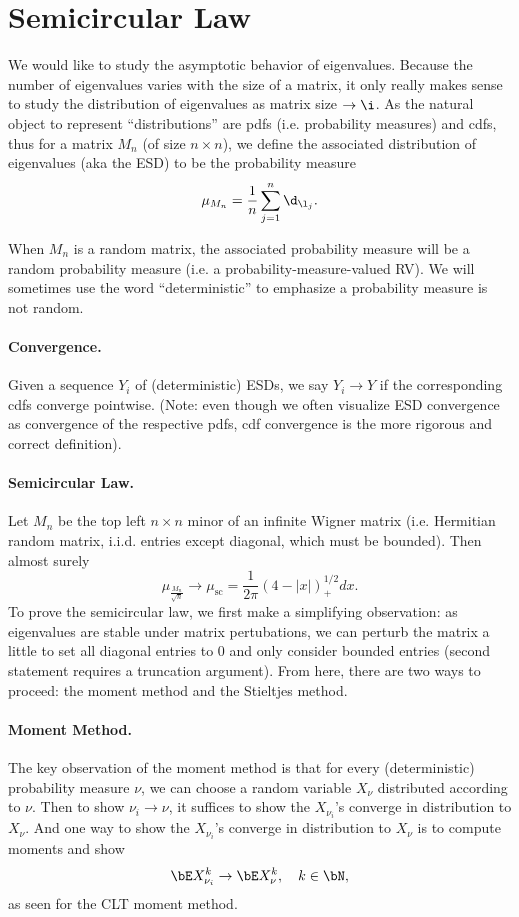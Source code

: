 \section{Semicircular Law}

We would like to study the asymptotic behavior of eigenvalues. Because the number of eigenvalues varies with the size of a matrix, it only really makes sense to study the distribution of eigenvalues as matrix size $\to \i$. As the natural object to represent ``distributions'' are pdfs (i.e. probability measures) and cdfs, thus for a matrix $M_n$ (of size $n \times n$), we define the associated distribution of eigenvalues (aka the ESD) to be the probability measure
\[
    \mu_{M_n} = \frac{1}{n} \sum_{j = 1}^n \d_{\l_j}.
\]

When $M_n$ is a random matrix, the associated probability measure will be a random probability measure (i.e. a probability-measure-valued RV). We will sometimes use the word ``deterministic'' to emphasize a probability measure is not random.

\paragraph{Convergence.} Given a sequence $Y_i$ of (deterministic) ESDs, we say $Y_i \to Y$ if the corresponding cdfs converge pointwise. (Note: even though we often visualize ESD convergence as convergence of the respective pdfs, cdf convergence is the more rigorous and correct definition).

\paragraph{Semicircular Law.} Let $M_n$ be the top left $n \times n$ minor of an infinite Wigner matrix (i.e. Hermitian random matrix, i.i.d. entries except diagonal, which must be bounded). Then almost surely
\[
    \mu_{\frac{M_n}{\sqrt{n}}} \to \mu_{\text{sc}} = \frac{1}{2\pi}(4 - |x|)_+^{1/2}dx.
\]
To prove the semicircular law, we first make a simplifying observation: as eigenvalues are stable under matrix pertubations, we can perturb the matrix a little to set all diagonal entries to 0 and only consider bounded entries (second statement requires a truncation argument). From here, there are two ways to proceed: the moment method and the Stieltjes method.

\paragraph{Moment Method.} The key observation of the moment method is that for every (deterministic) probability measure $\nu$, we can choose a random variable $X_{\nu}$ distributed according to $\nu$. Then to show $\nu_i \to \nu$, it suffices to show the $X_{\nu_i}$'s converge in distribution to $X_{\nu}$. And one way to show the $X_{\nu_i}$'s converge in distribution to $X_{\nu}$ is to compute moments and show
\[
    \bE X_{\nu_i}^k \to \bE X_{\nu}^k, \quad k \in \bN,
\]
as seen for the CLT moment method.

